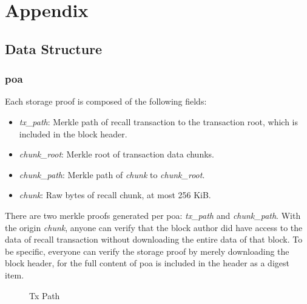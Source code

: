 \documentclass[]{article}
\begin{document}
\appendix
\section{Appendix}

\subsection{Data Structure}

\subsubsection{poa}\label{poa}

Each storage proof is composed of the following fields:

\begin{itemize}
    \item \textit{tx\_path}: Merkle path of recall transaction to the transaction root, which is included in the block header.
    \item \textit{chunk\_root}: Merkle root of transaction data chunks.
    \item \textit{chunk\_path}: Merkle path of \textit{chunk} to \textit{chunk\_root}.
    \item \textit{chunk}: Raw bytes of recall chunk, at most 256 KiB.
\end{itemize}

There are two merkle proofs generated per poa: \textit{tx\_path} and \textit{chunk\_path}. With the origin \textit{chunk}, anyone can verify that the block author did have access to the data of recall transaction without downloading the entire data of that block. To be specific, everyone can verify the storage proof by merely downloading the block header, for the full content of poa is included in the header as a digest item.

\begin{figure}
\caption{Tx Path}
\end{figure}
\end{document}

